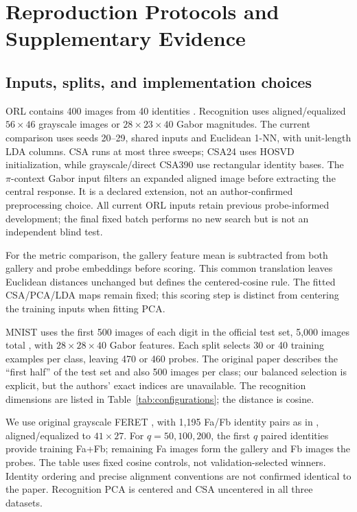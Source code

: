 \section{Reproduction Protocols and Supplementary Evidence}
\label{app:protocol}
\subsection{Inputs, splits, and implementation choices}
ORL contains 400 images from 40 identities \citep{orlData}. Recognition uses
aligned/equalized $56\times46$ grayscale images or $28\times23\times40$ Gabor
magnitudes. The current comparison uses seeds 20--29, shared inputs and
Euclidean 1-NN, with unit-length LDA columns. CSA runs at most three sweeps;
CSA24 uses HOSVD initialization, while grayscale/direct CSA390 use rectangular
identity bases. The $\pi$-context Gabor input filters an expanded aligned image
before extracting the central response. It is a declared extension, not an
author-confirmed preprocessing choice. All current ORL inputs retain previous
probe-informed development; the final fixed batch performs no new search but
is not an independent blind test.

For the metric comparison, the gallery feature mean is subtracted from both
gallery and probe embeddings before scoring. This common translation leaves
Euclidean distances unchanged but defines the centered-cosine rule. The fitted
CSA/PCA/LDA maps remain fixed; this scoring step is distinct from centering
the training inputs when fitting PCA.

MNIST uses the first 500 images of each digit in the official test set,
5,000 images total \citep{lecun1998mnist}, with $28\times28\times40$ Gabor features.
Each split selects 30 or 40 training examples per class, leaving 470 or 460
probes. The original paper describes the ``first half'' of the test set and
also 500 images per class; our balanced selection is explicit, but the authors'
exact indices are unavailable. The recognition dimensions are listed in
Table~\ref{tab:configurations}; the distance is cosine.

We use original grayscale FERET \citep{phillips2000feret}, with 1,195 Fa/Fb
identity pairs as in \citet[Sec.~IV-A]{xu2008csa}, aligned/equalized to $41\times27$.
For $q=50,100,200$, the first $q$ paired identities provide training Fa+Fb;
remaining Fa images form the gallery and Fb images the probes. The table uses
fixed cosine controls, not validation-selected winners.
Identity ordering and precise alignment conventions are not confirmed identical
to the paper. Recognition PCA is centered and CSA uncentered in all three datasets.


